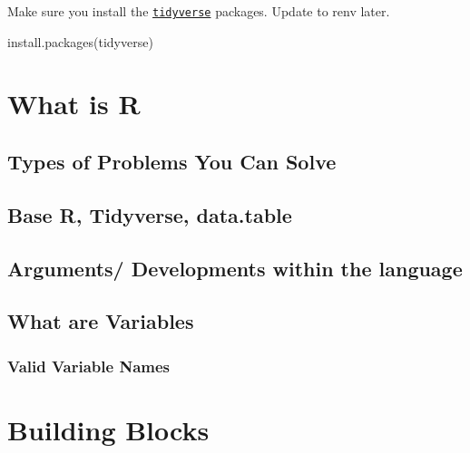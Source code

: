 \documentclass[
]{book}
\newenvironment{Shaded}{\begin{snugshade}}{\end{snugshade}}
\newcommand{\FunctionTok}[1]{\textcolor[rgb]{0.00,0.00,0.00}{#1}}
\newcommand{\NormalTok}[1]{#1}
\newcommand{\StringTok}[1]{\textcolor[rgb]{0.31,0.60,0.02}{#1}}
\begin{document}
Make sure you install the \href{https://www.tidyverse.org/}{\texttt{tidyverse}} packages. Update to renv later.

\begin{Shaded}
\begin{Highlighting}[]
\FunctionTok{install.packages}\NormalTok{(}\StringTok{\textquotesingle{}tidyverse\textquotesingle{}}\NormalTok{)}
\end{Highlighting}
\end{Shaded}

\hypertarget{what-is-r}{%
\chapter{What is R}\label{what-is-r}}

\hypertarget{types-of-problems-you-can-solve}{%
\section{Types of Problems You Can Solve}\label{types-of-problems-you-can-solve}}

\hypertarget{base-r-tidyverse-data.table}{%
\section{Base R, Tidyverse, data.table}\label{base-r-tidyverse-data.table}}

\hypertarget{arguments-developments-within-the-language}{%
\section{Arguments/ Developments within the language}\label{arguments-developments-within-the-language}}

\hypertarget{what-are-variables}{%
\section{What are Variables}\label{what-are-variables}}

\hypertarget{valid-variable-names}{%
\subsection{Valid Variable Names}\label{valid-variable-names}}

\hypertarget{functions}{%
\chapter{Building Blocks}\label{functions}}
\end{document}
